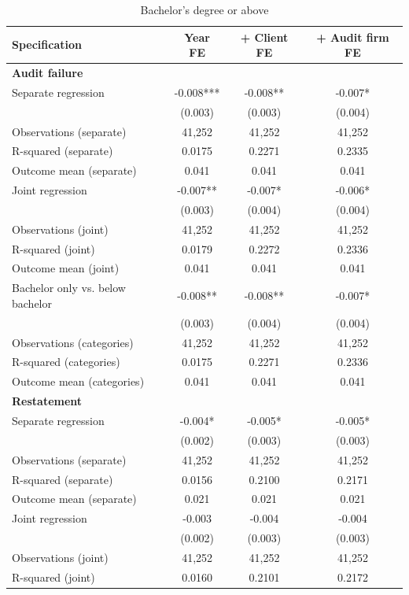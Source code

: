 \begin{table}[htbp]
\footnotesize
\centering
\caption{Bachelor's degree or above}
\begin{threeparttable}
\begin{tabular}{p{}ccc}
\toprule
Specification & Year FE & + Client FE & + Audit firm FE \\
\midrule
\multicolumn{4}{l}{\textbf{Audit failure}} \\
Separate regression & -0.008*** & -0.008** & -0.007* \\
 & (0.003) & (0.003) & (0.004) \\
Observations (separate) & 41,252 & 41,252 & 41,252 \\
R-squared (separate) & 0.0175 & 0.2271 & 0.2335 \\
Outcome mean (separate) & 0.041 & 0.041 & 0.041 \\
Joint regression & -0.007** & -0.007* & -0.006* \\
 & (0.003) & (0.004) & (0.004) \\
Observations (joint) & 41,252 & 41,252 & 41,252 \\
R-squared (joint) & 0.0179 & 0.2272 & 0.2336 \\
Outcome mean (joint) & 0.041 & 0.041 & 0.041 \\
Bachelor only vs. below bachelor & -0.008** & -0.008** & -0.007* \\
 & (0.003) & (0.004) & (0.004) \\
Observations (categories) & 41,252 & 41,252 & 41,252 \\
R-squared (categories) & 0.0175 & 0.2271 & 0.2336 \\
Outcome mean (categories) & 0.041 & 0.041 & 0.041 \\
\multicolumn{4}{l}{\textbf{Restatement}} \\
Separate regression & -0.004* & -0.005* & -0.005* \\
 & (0.002) & (0.003) & (0.003) \\
Observations (separate) & 41,252 & 41,252 & 41,252 \\
R-squared (separate) & 0.0156 & 0.2100 & 0.2171 \\
Outcome mean (separate) & 0.021 & 0.021 & 0.021 \\
Joint regression & -0.003 & -0.004 & -0.004 \\
 & (0.002) & (0.003) & (0.003) \\
Observations (joint) & 41,252 & 41,252 & 41,252 \\
R-squared (joint) & 0.0160 & 0.2101 & 0.2172 \\

\end{tabular}
\end{threeparttable}
\end{table}
